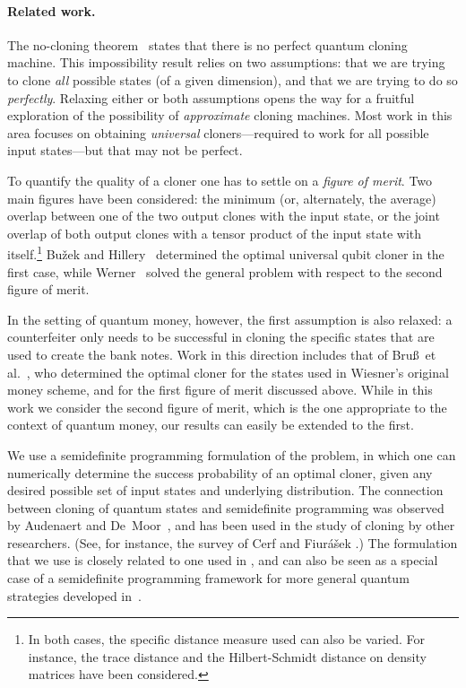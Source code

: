\documentclass[11pt,letterpaper]{article}
\theoremstyle{definition}
\begin{document}
\paragraph{Related work.}
The no-cloning theorem~\cite{WoottersZ82} states that there is no perfect
quantum cloning machine. 
This impossibility result relies on two assumptions: that we are
trying to clone \emph{all} possible states (of a given dimension), and
that we are trying to do so \emph{perfectly}.
Relaxing either or both assumptions opens the way for a fruitful
exploration of the possibility of \emph{approximate} cloning
machines. 
Most work in this area focuses on obtaining \emph{universal}
cloners---required to work for all possible input states---but that
may not be perfect. 

To quantify the quality of a cloner one has to settle on a
\emph{figure of merit}.
Two main figures have been considered: the minimum 
(or, alternately, the average) overlap between one of the two output
clones with the input state, or the joint overlap of both output clones
with a tensor product of the input state with itself.\footnote{%
  In both cases, the specific distance measure used can also be
  varied.
  For instance, the trace distance and the Hilbert-Schmidt distance on
  density matrices have been considered.} 
Bu\v{z}ek and Hillery~\cite{BuzekH96} determined the optimal universal
qubit cloner in the first case, while Werner~\cite{Werner98} solved
the general problem with respect to the second figure of merit.

In the setting of quantum money, however, the first assumption is also
relaxed: a counterfeiter only needs to be successful in cloning the
specific states that are used to create the bank notes.
Work in this direction includes that of Bru\ss\ et
al.~\cite{BruCDM00}, who determined the optimal cloner for
the states used in Wiesner's original money scheme, and for the first
figure of merit discussed above. 
While in this work we consider the second figure of merit, which is
the one appropriate to the context of quantum money, our results can
easily be extended to the first. 

We use a semidefinite programming formulation of the problem, in which one can numerically determine the success probability of an optimal cloner, given any desired possible set of input states and underlying distribution. The connection between cloning of quantum states and semidefinite
programming was observed by Audenaert and De~Moor~\cite{AudenaertD02},
and has been used in the study of cloning by other researchers.
(See, for instance, the survey of Cerf and 
Fiur\'{a}\v{s}ek \cite{CerfF06}.) 
The formulation that we use is closely related to one used in
\cite{MolinaW11}, and can also be seen as a special case of a
semidefinite programming framework for more general quantum strategies
developed in~\cite{GutoskiW07}.
\end{document}
